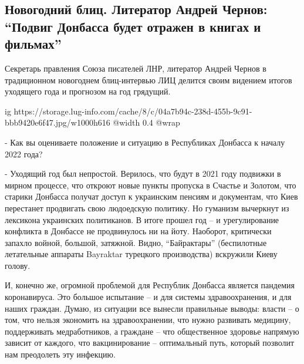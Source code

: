  
 
 
 
 
\subsection{Новогодний блиц. Литератор Андрей Чернов: \enquote{Подвиг Донбасса будет отражен в книгах и фильмах}}
\label{sec:24_12_2021.stz.news.lnr.lug_info.3.podvig_donbassa}


Секретарь правления Союза писателей ЛНР, литератор Андрей Чернов в традиционном
новогоднем блиц-интервью ЛИЦ делится своим видением итогов уходящего года и
прогнозом на год грядущий.

\ifcmt
  ig https://storage.lug-info.com/cache/8/c/04a7b94c-238d-455b-9c91-bbb9420e6f47.jpg/w1000h616%
  @width 0.4
  @wrap 
\fi

- Как вы оцениваете положение и ситуацию в Республиках Донбасса к началу 2022
года?

- Уходящий год был непростой. Верилось, что будут в 2021 году подвижки в мирном
процессе, что откроют новые пункты пропуска в Счастье и Золотом, что старики
Донбасса получат доступ к украинским пенсиям и документам, что Киев перестанет
продвигать свою людоедскую политику. Но гуманизм вычеркнут из лексикона
украинских политиканов. В итоге прошел год – и урегулирование конфликта в
Донбассе не продвинулось ни на йоту. Наоборот, критически запахло войной,
большой, затяжной. Видно, \enquote{Байрактары} (беспилотные летательные аппараты
Bayraktar турецкого производства) вскружили Киеву голову.

И, конечно же, огромной проблемой для Республик Донбасса является пандемия
коронавируса. Это большое испытание – и для системы здравоохранения, и для
наших граждан. Думаю, из ситуации все вынесли правильные выводы: власти – о
том, что нельзя экономить на здравоохранении, что нужно развивать медицину,
поддерживать медработников, а граждане – что общественное здоровье напрямую
зависит от каждого, что вакцинирование – оптимальный путь, который позволит нам
преодолеть эту инфекцию.

